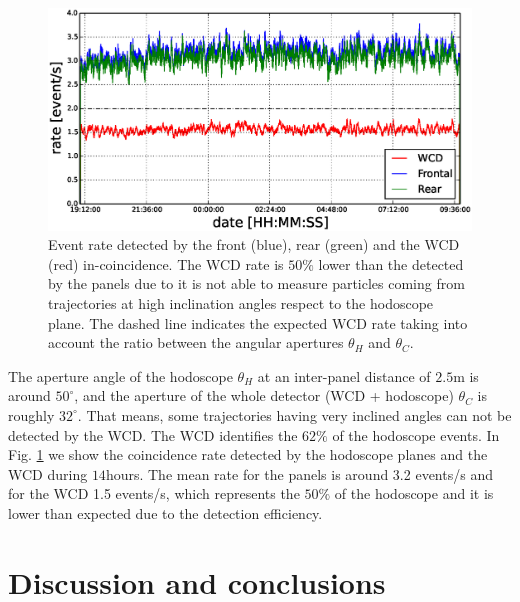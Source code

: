 \documentclass[letterpaper,11pt]{article}
\begin{document}
\begin{figure}[htb]
\centering
\includegraphics[width=0.8\columnwidth]{Figures/HodWCDRate.eps}
\caption{Event rate detected by the front (blue), rear (green) and the WCD (red) in-coincidence. The WCD rate is $50\%$ lower than the detected by the panels due to it is not able to measure particles coming from trajectories at high inclination angles respect to the hodoscope plane. The dashed line indicates the expected WCD rate taking into account the ratio between the angular apertures $\theta_H$ and $\theta_C$.}
\label{fig:RateWCDH}
\end{figure}

The aperture angle of the hodoscope $\theta_H$ at an inter-panel distance of $2.5$m is around $50^{\circ}$, and the aperture of the whole detector (WCD + hodoscope) $\theta_C$ is roughly $32^{\circ}$. That means, some trajectories having very inclined angles can not be detected by the WCD. The WCD identifies the $62\%$ of the hodoscope events. In Fig. \ref{fig:RateWCDH} we show the coincidence rate detected by the hodoscope planes and the WCD during $14$hours. The mean rate for the panels is around 3.2 events/s and for the WCD 1.5 events/s, which represents the $50\%$ of the hodoscope and it is lower than expected due to the detection efficiency.


\section{Discussion and conclusions}
\label{conclusions}
\end{document}
